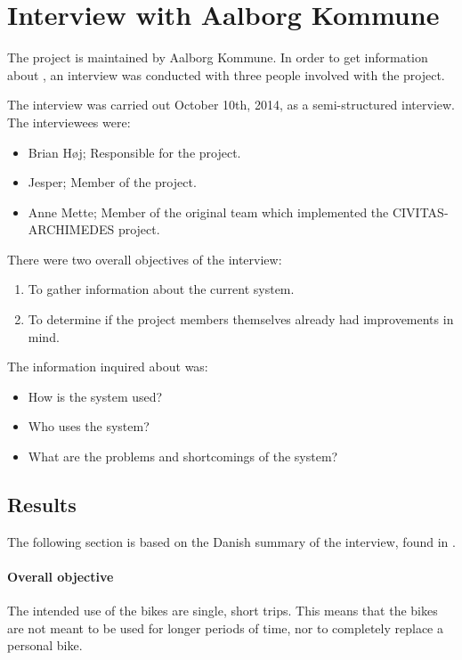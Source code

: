 \section{Interview with Aalborg Kommune}
The \citybike project is maintained by Aalborg Kommune.
In order to get information about \citybike, an interview was conducted with three people involved with the project.

The interview was carried out October 10th, 2014, as a semi-structured interview.
The interviewees were:
\begin{itemize}
\item Brian Høj; Responsible for the \citybike project.
\item Jesper; Member of the \citybike project.
\item Anne Mette; Member of the original team which implemented the CIVITAS-ARCHIMEDES project\cite{aalborgbycyklenbagcyklen}.
\end{itemize}

\noindent There were two overall objectives of the interview:
\begin{enumerate}
\item To gather information about the current system.
\item To determine if the project members themselves already had improvements in mind.
\end{enumerate}

The information inquired about was:
\begin{itemize}
\item How is the system used?
\item Who uses the system?
\item What are the problems and shortcomings of the system?
\end{itemize}

\subsection{Results} \label{interview:goals}
The following section is based on the Danish summary of the interview, found in .

\paragraph{Overall objective}
The intended use of the bikes are single, short trips.
This means that the bikes are not meant to be used for longer periods of time, nor to completely replace a personal bike.

